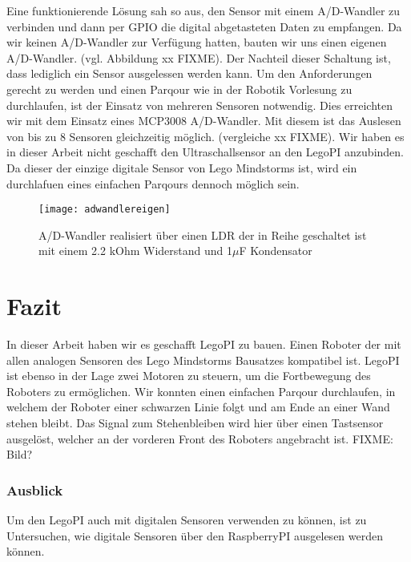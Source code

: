Eine funktionierende Lösung sah so aus, den Sensor mit einem A/D-Wandler zu verbinden und dann per GPIO die digital abgetasteten Daten zu empfangen. Da wir keinen A/D-Wandler zur Verfügung hatten, bauten wir uns einen eigenen A/D-Wandler. (vgl. Abbildung xx FIXME). Der Nachteil dieser Schaltung ist, dass lediglich ein Sensor ausgelessen werden kann. Um den Anforderungen gerecht zu werden und einen Parqour wie in der Robotik Vorlesung zu durchlaufen, ist der Einsatz von mehreren Sensoren notwendig. Dies erreichten wir mit dem Einsatz eines MCP3008 A/D-Wandler. Mit diesem ist das Auslesen von bis zu 8 Sensoren gleichzeitig möglich. (vergleiche xx FIXME). Wir haben es in dieser Arbeit nicht geschafft den Ultraschallsensor an den LegoPI anzubinden. Da dieser der einzige digitale Sensor von Lego Mindstorms ist, wird ein durchlafuen eines einfachen Parqours dennoch möglich sein.

\begin{figure}[h]
  \centering
  \texttt{[image: adwandlereigen]}
  \caption{A/D-Wandler realisiert über einen LDR der in Reihe geschaltet ist mit einem 2.2 kOhm Widerstand und 1$\mu$F Kondensator}
  \label{Kap1:Lightsensor}
\end{figure}


\chapter{Fazit}

In dieser Arbeit haben wir es geschafft LegoPI zu bauen. Einen Roboter der mit allen analogen Sensoren des Lego Mindstorms Bausatzes kompatibel ist. LegoPI ist ebenso in der Lage zwei Motoren zu steuern, um die Fortbewegung des Roboters zu ermöglichen. Wir konnten einen einfachen Parqour durchlaufen, in welchem der Roboter einer schwarzen Linie folgt und am Ende an einer Wand stehen bleibt. Das Signal zum Stehenbleiben wird hier über einen Tastsensor ausgelöst, welcher an der vorderen Front des Roboters angebracht ist. FIXME: Bild?

\subsection{Ausblick}
Um den LegoPI auch mit digitalen Sensoren verwenden zu können, ist zu Untersuchen, wie digitale Sensoren über den RaspberryPI ausgelesen werden können.